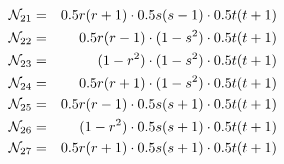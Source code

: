 \begin{eqnarray}
{\mathcal{N}}_{21}&=& 0.5r(r+1)  \cdot 0.5s(s-1) \cdot 0.5t(t+1) \nonumber\\
{\mathcal{N}}_{22}&=&  0.5r(r-1) \cdot (1-s^2)   \cdot 0.5t(t+1) \nonumber\\
{\mathcal{N}}_{23}&=&  (1-r^2)   \cdot (1-s^2)   \cdot 0.5t(t+1) \nonumber\\
{\mathcal{N}}_{24}&=& 0.5r(r+1)  \cdot (1-s^2)   \cdot 0.5t(t+1) \nonumber\\
{\mathcal{N}}_{25}&=&  0.5r(r-1) \cdot 0.5s(s+1) \cdot 0.5t(t+1) \nonumber\\
{\mathcal{N}}_{26}&=&  (1-r^2)   \cdot 0.5s(s+1) \cdot 0.5t(t+1) \nonumber\\
{\mathcal{N}}_{27}&=& 0.5r(r+1)  \cdot 0.5s(s+1) \cdot 0.5t(t+1) \nonumber
\end{eqnarray}






